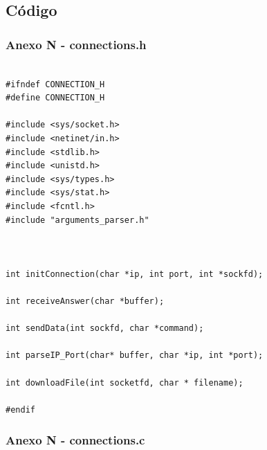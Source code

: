 \documentclass[11pt]{article}
\begin{document}
\pagebreak


\subsection{Código}

\subsubsection{ Anexo N - connections.h}

\begin{lstlisting}[style=CStyle]

#ifndef CONNECTION_H
#define CONNECTION_H

#include <sys/socket.h>
#include <netinet/in.h>
#include <stdlib.h>
#include <unistd.h>
#include <sys/types.h>
#include <sys/stat.h>
#include <fcntl.h>
#include "arguments_parser.h"



int initConnection(char *ip, int port, int *sockfd);

int receiveAnswer(char *buffer);

int sendData(int sockfd, char *command);

int parseIP_Port(char* buffer, char *ip, int *port);

int downloadFile(int socketfd, char * filename);

#endif

\end{lstlisting}

\subsubsection{ Anexo N - connections.c}
\end{document}
